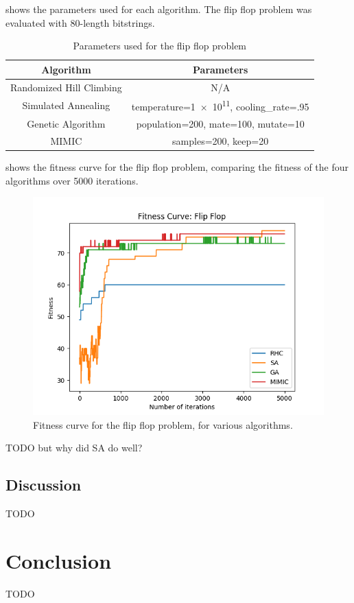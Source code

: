 \documentclass{article}
\begin{document}
       shows the parameters used for each algorithm. The flip flop problem was evaluated with 80-length bitstrings.

      \begin{table}[h!]
      \centering
        \begin{tabular}{||c|c||}\hline
          \textbf{Algorithm} & \textbf{Parameters} \\ \hline
          Randomized Hill Climbing & N/A \\ \hline
          Simulated Annealing & temperature=\num{1e11}, cooling\_rate=.95 \\ \hline
          Genetic Algorithm & population=200, mate=100, mutate=10 \\ \hline
          MIMIC & samples=200, keep=20 \\ \hline
        \end{tabular}

        \caption{Parameters used for the flip flop problem}
        \label{tab:ff-params}
      \end{table}

       shows the fitness curve for the flip flop problem, comparing the fitness of the four algorithms over 5000 iterations.

      \begin{figure}[htb]
      \centering
      \includegraphics[width=.5\linewidth]{out/op/flipflop/fitness.png}
      \caption{Fitness curve for the flip flop problem, for various algorithms.}
      \label{fig:fitness-ff}
      \end{figure}

      TODO but why did SA do well?

    \subsection{Discussion}
      TODO

  \section{Conclusion}
    TODO
\end{document}
